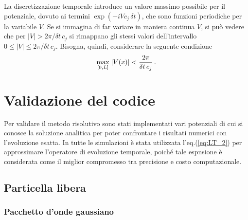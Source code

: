 \documentclass[12pt]{report}
\begin{document}
La discretizzazione temporale introduce un valore massimo possibile per il potenziale, dovuto ai termini $ \exp \left(- i V c_{j} \, \delta t\right)$, che sono funzioni periodiche per la variabile $V$. Se si immagina di far variare in maniera continua $V$, si può vedere che per $|V| > 2 \pi / \delta t \,  c_j$ si rimappano gli stessi valori dell'intervallo $0 \le |V| \le 2 \pi / \delta t \,  c_j$.
Bisogna, quindi, considerare la seguente condizione
\begin{equation}
    \underset{[0, L]}{\max} \; \abs{V(x)} < \frac{2 \pi}{\delta t \, c_{j}} \, \text{.}
    \label{eq:V_max}
\end{equation}


\chapter{Validazione del codice}
\label{ch:Validazione}

Per validare il metodo risolutivo sono stati implementati vari potenziali di cui si conosce la soluzione analitica per poter confrontare i risultati numerici con l'evoluzione esatta. In tutte le simulazioni è stata utilizzata l'eq.(\ref{eq:LT_2}) per approssimare l'operatore di evoluzione temporale, poiché tale espnsione è considerata come il miglior compromesso tra precisione e costo computazionale.

\section{Particella libera}
\label{sec:free}

\subsection{Pacchetto d'onde gaussiano}
\label{sec:WP_gaussiano}
\end{document}
